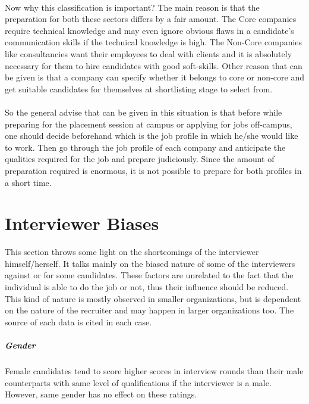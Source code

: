 \documentclass[a4paper,12pt]{report}
\begin{document}
\subsubsection{}
Now why this classification is important? The main reason is that the preparation for both these sectors
 differs by a fair amount. The Core companies require technical knowledge and may even ignore obvious flaws in
a candidate's communication skills if the technical knowledge is high. The Non-Core companies like consultancies
want their employees to deal with clients and it is absolutely necessary for them to hire candidates with good
soft-skills. Other reason that can be given is that a company can specify whether it belongs to core or non-core
and get suitable candidates for themselves at shortlisting stage to select from.
\subsubsection{}
So the general advise that can be given in this situation is that before while preparing for the placement session 
at campus or applying for jobs off-campus, one should decide beforehand which is the job profile in which he/she would like to work. 
Then go through the job profile of each company and anticipate the qualities required for the job and prepare judiciously.
Since the amount of preparation required is enormous, it is not possible to prepare for both profiles in a short time.

\chapter{Interviewer Biases}
This section throws some light on the shortcomings of the interviewer himself/herself. It talks mainly on the
biased nature of some of the interviewers against or for some candidates. These factors are unrelated to the fact that 
the individual is able to do the job or not, thus their influence should be reduced. This kind of nature is mostly observed in
smaller organizations, but is dependent on the nature of the recruiter and may happen in larger organizations too.
The source of each data is cited in each case.
\paragraph{Gender}
Female candidates tend to score higher scores in interview rounds than their male counterparts with same
level of qualifications if the interviewer is a male\cite{bias}. However, same gender has no effect on these ratings.
\end{document}
